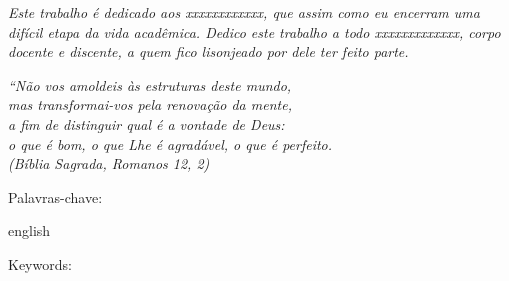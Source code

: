 \begin{dedicatoria}
   \vspace*{\fill}
   \centering
   \noindent
   \textit{ Este trabalho é dedicado aos xxxxxxxxxxxx, que assim como eu encerram uma difícil etapa da vida acadêmica. Dedico este trabalho a todo xxxxxxxxxxxxx, corpo docente e discente, a quem fico lisonjeado por dele ter feito parte.} \vspace*{\fill}
\end{dedicatoria}

\begin{agradecimentos}
\lipsum[2]



\end{agradecimentos}

\begin{epigrafe}
    \vspace*{\fill}
	\begin{flushright}
		\textit{``Não vos amoldeis às estruturas deste mundo, \\
		mas transformai-vos pela renovação da mente, \\
		a fim de distinguir qual é a vontade de Deus: \\
		o que é bom, o que Lhe é agradável, o que é perfeito.\\
		(Bíblia Sagrada, Romanos 12, 2)}
	\end{flushright}
\end{epigrafe}


\setlength{\absparsep}{18pt} %
\begin{resumo}
\SingleSpacing
 \lipsum[1]

 Palavras-chave: \imprimirpalavraschave
\end{resumo}

\begin{resumo}[Abstract]
 \begin{otherlanguage*}{english}
\SingleSpacing
 \lipsum[3]
   \vspace{\onelineskip}
 
   \noindent 
   Keywords: \imprimirkeywords
 \end{otherlanguage*}
\end{resumo}
